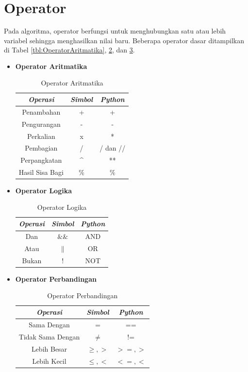\section{Operator}
Pada algoritma, operator berfungsi untuk menghubungkan satu atau lebih variabel sehingga menghasilkan nilai baru. Beberapa operator dasar ditampilkan di Tabel \ref{tbl:OperatorAritmatika}, \ref{tbl:operatorLogika}, dan \ref{tbl:operatorPerbandingan}.

\FloatBarrier
\begin{itemize}

	\item \textbf{Operator Aritmatika}
			\large
			\begin{table}
				\centering
				\begin{tabular}[h!]{| c | c | c |}
				\hline	
				\textit{Operasi} & \textit{Simbol} & \textit{Python} \\ \hline
				Penambahan & + & + \\ \hline
				Pengurangan & - & - \\ \hline
				Perkalian & x & * \\ \hline
				Pembagian & / & / dan // \\ \hline
				Perpangkatan & \^{}  & ** \\ \hline
				Hasil Sisa Bagi & \% & \% \\
				\hline
				\end{tabular}
				\caption{Operator Aritmatika}
				\label{tbl:operatorAritmatika}
		\end{table}
	\FloatBarrier
	\item \textbf{Operator Logika}
			\large
			\begin{table}
				\centering
				\begin{tabular}[h!]{| c | c | c |}
				\hline	
				\textit{Operasi} & \textit{Simbol} & \textit{Python} \\ \hline
				Dan & $\&\&$ & AND \\ \hline
				Atau & $\|$ & OR \\ \hline
				Bukan & $!$ & NOT \\ 
				\hline
				\end{tabular}
				\caption{Operator Logika}
				\label{tbl:operatorLogika}
		\end{table}

\FloatBarrier	
	\item \textbf{Operator Perbandingan}
			\large
			\begin{table}
				\centering
				\begin{tabular}[h!]{| c | c | c |}
				\hline	
				\textit{Operasi} & \textit{Simbol} & \textit{Python} \\ \hline
				Sama Dengan & $=$ & == \\ \hline
				Tidak Sama Dengan & $\neq$ & != \\ \hline
				Lebih Besar & $\geq,>$ & $>=,>$ \\ \hline
				Lebih Kecil & $\leq,<$ & $<=,<$ \\
				\hline
				\end{tabular}
				\caption{Operator Perbandingan}
				\label{tbl:operatorPerbandingan}
		\end{table}
\end{itemize}

